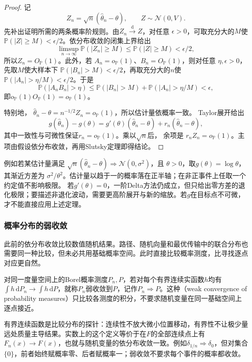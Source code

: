 \begin{proof}
记
\[
  Z_n=\sqrt n(\widehat\theta_n-\theta),
  \qquad
  Z\sim\mathcal N(0,V).
\]
先补出证明所需的两条概率阶规则。由\(Z_n\xrightarrow{\mathrm d}Z\)，对任意
\(\epsilon>0\)，可取充分大的\(M\)使
\(\mathbb{P}(|Z|\geq M)<\epsilon/2\)。依分布收敛的闭集上界给出
\[
  \limsup_{n\to\infty}\mathbb{P}(|Z_n|\geq M)
  \leq \mathbb{P}(|Z|\geq M)<\epsilon/2,
\]
所以\(Z_n=O_{\mathbb{P}}(1)\)。此外，若
\(A_n=o_{\mathbb{P}}(1)\)、\(B_n=O_{\mathbb{P}}(1)\)，则对任意
\(\eta,\epsilon>0\)，先取\(M\)使大样本下
\(\mathbb{P}(|B_n|>M)<\epsilon/2\)，再取充分大的\(n\)使
\(\mathbb{P}(|A_n|>\eta/M)<\epsilon/2\)。于是
\[
  \mathbb{P}(|A_nB_n|>\eta)
  \leq
  \mathbb{P}(|B_n|>M)
  +\mathbb{P}(|A_n|>\eta/M)
  <\epsilon,
\]
即\(o_{\mathbb{P}}(1)O_{\mathbb{P}}(1)=o_{\mathbb{P}}(1)\)。

特别地，
\(\widehat\theta_n-\theta=n^{-1/2}Z_n=o_{\mathbb{P}}(1)\)，所以估计量依概率一致。
Taylor展开给出
\[
  g(\widehat\theta_n)-g(\theta)
  =g'(\theta)(\widehat\theta_n-\theta)
   +r_n(\widehat\theta_n-\theta),
\]
其中一致性与可微性保证\(r_n=o_{\mathbb{P}}(1)\)。乘以\(\sqrt n\)后，
余项是
\(r_nZ_n=o_{\mathbb{P}}(1)\)。主项由假设依分布收敛，再用Slutsky定理即得结论。
\end{proof}

例如若某估计量满足
\(\sqrt n(\widehat\theta_n-\theta)\Rightarrow\mathcal N(0,\sigma^2)\)，且
\(\theta>0\)，取\(g(\theta)=\log\theta\)，其渐近方差为
\(\sigma^2/\theta^2\)。估计量以趋于一的概率落在正半轴；在非正事件上任取一个约定值不影响极限。
若\(g'(\theta)=0\)，一阶Delta方法仍成立，但只给出零方差的退化极限；要描述非退化波动，需要更高阶展开与新的缩放。若\(g\)在目标点不可微，才不能直接应用上述定理。

\subsubsection{概率分布的弱收敛}
\label{sec:rv-weak-convergence}
此前的依分布收敛比较数值随机结果。路径、随机向量和最优传输中的联合分布也需要同一种比较，但未必共用基础概率空间。此时直接比较概率测度，比寻找逐点对应更自然。

\begin{definition}[概率测度的弱收敛]
\label{def:information-weak-measure-convergence}
对同一度量空间上的Borel概率测度\(P_n,P\)，若对每个有界连续实函数\(h\)均有
\(\int h\,\mathrm dP_n\to\int h\,\mathrm dP\)，就称\(P_n\)弱收敛到\(P\)，记作\(P_n\Rightarrow P\)。这种（weak convergence of probability measures）只比较各测度的积分，不要求随机变量在同一基础空间上逐点接近。
\end{definition}
有界连续函数是比较分布的探针：连续性不放大微小位置移动，有界性不让极少量远处质量主导结果。实数上的这个定义等价于在\(F\)的全部连续点上有\(F_n(x)\to F(x)\)，也就与随机变量的依分布收敛一致。例如\(\delta_{1/n}\Rightarrow\delta_0\)，但对集合\(\{0\}\)，前者始终赋概率零、后者赋概率一；弱收敛不要求每个事件的概率都收敛。

